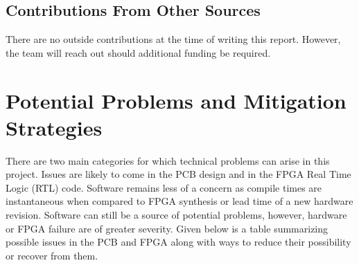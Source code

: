 \documentclass[letterpaper,12pt]{article}
\begin{document}
\subsection{Contributions From Other Sources}
There are no outside contributions at the time of writing this report. However,
the team will reach out should additional funding be required. 

\section{Potential Problems and Mitigation Strategies}
There are two main categories for which technical problems can arise in this
project. Issues are likely to come in the PCB design and in the FPGA Real Time
Logic (RTL) code. Software remains less of a concern as compile times are
instantaneous when compared to FPGA synthesis or lead time of a new hardware
revision. Software can still be a source of potential problems, however,
hardware or FPGA failure are of greater severity. Given below is a table
summarizing possible issues in the PCB and FPGA along with ways to reduce their
possibility or recover from them.
\end{document}
